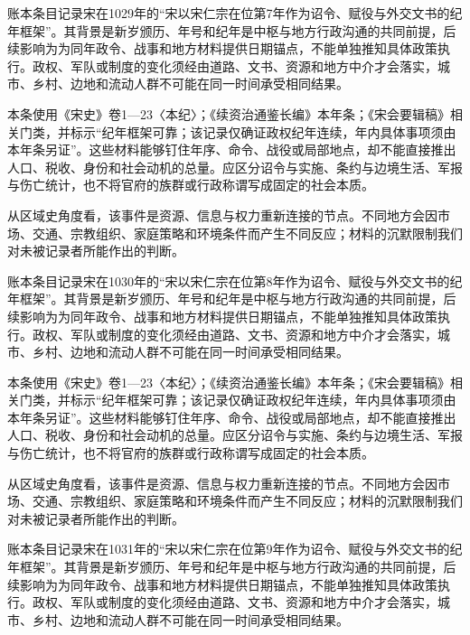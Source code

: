 账本条目记录宋在1029年的“宋以宋仁宗在位第7年作为诏令、赋役与外交文书的纪年框架”。其背景是新岁颁历、年号和纪年是中枢与地方行政沟通的共同前提，后续影响为为同年政令、战事和地方材料提供日期锚点，不能单独推知具体政策执行。政权、军队或制度的变化须经由道路、文书、资源和地方中介才会落实，城市、乡村、边地和流动人群不可能在同一时间承受相同结果。

本条使用《宋史》卷1—23〈本纪〉；《续资治通鉴长编》本年条；《宋会要辑稿》相关门类，并标示“纪年框架可靠；该记录仅确证政权纪年连续，年内具体事项须由本年条另证”。这些材料能够钉住年序、命令、战役或局部地点，却不能直接推出人口、税收、身份和社会动机的总量。应区分诏令与实施、条约与边境生活、军报与伤亡统计，也不将官府的族群或行政称谓写成固定的社会本质。

从区域史角度看，该事件是资源、信息与权力重新连接的节点。不同地方会因市场、交通、宗教组织、家庭策略和环境条件而产生不同反应；材料的沉默限制我们对未被记录者所能作出的判断。

账本条目记录宋在1030年的“宋以宋仁宗在位第8年作为诏令、赋役与外交文书的纪年框架”。其背景是新岁颁历、年号和纪年是中枢与地方行政沟通的共同前提，后续影响为为同年政令、战事和地方材料提供日期锚点，不能单独推知具体政策执行。政权、军队或制度的变化须经由道路、文书、资源和地方中介才会落实，城市、乡村、边地和流动人群不可能在同一时间承受相同结果。

本条使用《宋史》卷1—23〈本纪〉；《续资治通鉴长编》本年条；《宋会要辑稿》相关门类，并标示“纪年框架可靠；该记录仅确证政权纪年连续，年内具体事项须由本年条另证”。这些材料能够钉住年序、命令、战役或局部地点，却不能直接推出人口、税收、身份和社会动机的总量。应区分诏令与实施、条约与边境生活、军报与伤亡统计，也不将官府的族群或行政称谓写成固定的社会本质。

从区域史角度看，该事件是资源、信息与权力重新连接的节点。不同地方会因市场、交通、宗教组织、家庭策略和环境条件而产生不同反应；材料的沉默限制我们对未被记录者所能作出的判断。

账本条目记录宋在1031年的“宋以宋仁宗在位第9年作为诏令、赋役与外交文书的纪年框架”。其背景是新岁颁历、年号和纪年是中枢与地方行政沟通的共同前提，后续影响为为同年政令、战事和地方材料提供日期锚点，不能单独推知具体政策执行。政权、军队或制度的变化须经由道路、文书、资源和地方中介才会落实，城市、乡村、边地和流动人群不可能在同一时间承受相同结果。

